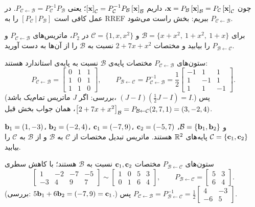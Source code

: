 \begin{note}[در $\R^n$]
چون $\mathbf{x}=P_{\mathcal{B}}\left[\mathbf{x}\right]_{\mathcal{B}}=P_{\mathcal{C}}\left[\mathbf{x}\right]_{\mathcal{C}}$، داریم $\left[\mathbf{x}\right]_{\mathcal{C}}=P_{\mathcal{C}}^{-1}P_{\mathcal{B}}\left[\mathbf{x}\right]_{\mathcal{B}}$؛ یعنی $P_{\mathcal{C}\leftarrow\mathcal{B}}=P_{\mathcal{C}}^{-1}P_{\mathcal{B}}$. در عمل کافی است $[P_{\mathcal{C}}\,|\,P_{\mathcal{B}}]$ را به RREF ببریم: بخش راست می‌شود $P_{\mathcal{C}\leftarrow\mathcal{B}}$.
\end{note}

\begin{example}
برای $\mathcal{B}=\{x+x^2,\ 1+x^2,\ 1+x\}$ و $\mathcal{C}=\{1,x,x^2\}$ در $P_2$، ماتریس‌های $P_{\mathcal{C}\leftarrow\mathcal{B}}$ و $P_{\mathcal{B}\leftarrow\mathcal{C}}$ را بیابید و مختصات $2+7x+x^2$ نسبت به $\mathcal{B}$ را از آن‌ها به دست آورید.
\end{example}
\begin{solution}
ستون‌های $P_{\mathcal{C}\leftarrow\mathcal{B}}$ مختصات پایه‌ی $\mathcal{B}$ نسبت به پایه‌ی استاندارد هستند:
\[
P_{\mathcal{C}\leftarrow\mathcal{B}}=\begin{bmatrix}0&1&1\\1&0&1\\1&1&0\end{bmatrix},\qquad
P_{\mathcal{B}\leftarrow\mathcal{C}}=P_{\mathcal{C}\leftarrow\mathcal{B}}^{-1}=\frac12\begin{bmatrix}-1&1&1\\1&-1&1\\1&1&-1\end{bmatrix}.
\]
(بررسی: اگر $J$ ماتریس تمام‌یک باشد، $(J-I)(\frac12J-I)=I$.) پس
$\left[2+7x+x^2\right]_{\mathcal{B}}=P_{\mathcal{B}\leftarrow\mathcal{C}}(2,7,1)=(3,-2,4)$، همان جواب بخش قبل.
\end{solution}

\begin{example}
$\mathbf{b}_1=(1,-3)$، $\mathbf{b}_2=(-2,4)$، $\mathbf{c}_1=(-7,9)$، $\mathbf{c}_2=(-5,7)$ و $\mathcal{B}=\{\mathbf{b}_1,\mathbf{b}_2\}$، $\mathcal{C}=\{\mathbf{c}_1,\mathbf{c}_2\}$ پایه‌های $\mathbb{R}^2$ هستند. ماتریس تبدیل مختصات از $\mathcal{C}$ به $\mathcal{B}$ و از $\mathcal{B}$ به $\mathcal{C}$ را بیابید.
\end{example}
\begin{solution}
ستون‌های $P_{\mathcal{B}\leftarrow\mathcal{C}}$ مختصات $\mathbf{c}_1,\mathbf{c}_2$ نسبت به $\mathcal{B}$ هستند؛ با کاهش سطری
\[
\left[\begin{array}{cc|cc}1&-2&-7&-5\\-3&4&9&7\end{array}\right]\sim
\left[\begin{array}{cc|cc}1&0&5&3\\0&1&6&4\end{array}\right],
\qquad P_{\mathcal{B}\leftarrow\mathcal{C}}=\begin{bmatrix}5&3\\6&4\end{bmatrix}.
\]
(بررسی: $5\mathbf{b}_1+6\mathbf{b}_2=(-7,9)=\mathbf{c}_1$.) پس $P_{\mathcal{C}\leftarrow\mathcal{B}}=P_{\mathcal{B}\leftarrow\mathcal{C}}^{-1}=\frac12\begin{bmatrix}4&-3\\-6&5\end{bmatrix}$.
\end{solution}

